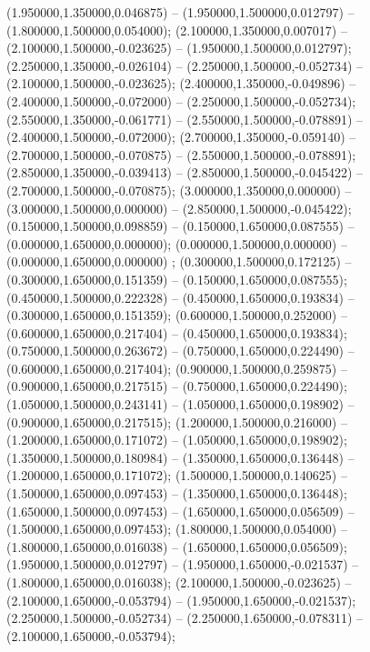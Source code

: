  (1.950000,1.350000,0.046875) -- (1.950000,1.500000,0.012797) -- (1.800000,1.500000,0.054000);
 (2.100000,1.350000,0.007017) -- (2.100000,1.500000,-0.023625) -- (1.950000,1.500000,0.012797);
 (2.250000,1.350000,-0.026104) -- (2.250000,1.500000,-0.052734) -- (2.100000,1.500000,-0.023625);
 (2.400000,1.350000,-0.049896) -- (2.400000,1.500000,-0.072000) -- (2.250000,1.500000,-0.052734);
 (2.550000,1.350000,-0.061771) -- (2.550000,1.500000,-0.078891) -- (2.400000,1.500000,-0.072000);
 (2.700000,1.350000,-0.059140) -- (2.700000,1.500000,-0.070875) -- (2.550000,1.500000,-0.078891);
 (2.850000,1.350000,-0.039413) -- (2.850000,1.500000,-0.045422) -- (2.700000,1.500000,-0.070875);
 (3.000000,1.350000,0.000000) -- (3.000000,1.500000,0.000000) -- (2.850000,1.500000,-0.045422);
 (0.150000,1.500000,0.098859) -- (0.150000,1.650000,0.087555) -- (0.000000,1.650000,0.000000);
 (0.000000,1.500000,0.000000) -- (0.000000,1.650000,0.000000) ;
 (0.300000,1.500000,0.172125) -- (0.300000,1.650000,0.151359) -- (0.150000,1.650000,0.087555);
 (0.450000,1.500000,0.222328) -- (0.450000,1.650000,0.193834) -- (0.300000,1.650000,0.151359);
 (0.600000,1.500000,0.252000) -- (0.600000,1.650000,0.217404) -- (0.450000,1.650000,0.193834);
 (0.750000,1.500000,0.263672) -- (0.750000,1.650000,0.224490) -- (0.600000,1.650000,0.217404);
 (0.900000,1.500000,0.259875) -- (0.900000,1.650000,0.217515) -- (0.750000,1.650000,0.224490);
 (1.050000,1.500000,0.243141) -- (1.050000,1.650000,0.198902) -- (0.900000,1.650000,0.217515);
 (1.200000,1.500000,0.216000) -- (1.200000,1.650000,0.171072) -- (1.050000,1.650000,0.198902);
 (1.350000,1.500000,0.180984) -- (1.350000,1.650000,0.136448) -- (1.200000,1.650000,0.171072);
 (1.500000,1.500000,0.140625) -- (1.500000,1.650000,0.097453) -- (1.350000,1.650000,0.136448);
 (1.650000,1.500000,0.097453) -- (1.650000,1.650000,0.056509) -- (1.500000,1.650000,0.097453);
 (1.800000,1.500000,0.054000) -- (1.800000,1.650000,0.016038) -- (1.650000,1.650000,0.056509);
 (1.950000,1.500000,0.012797) -- (1.950000,1.650000,-0.021537) -- (1.800000,1.650000,0.016038);
 (2.100000,1.500000,-0.023625) -- (2.100000,1.650000,-0.053794) -- (1.950000,1.650000,-0.021537);
 (2.250000,1.500000,-0.052734) -- (2.250000,1.650000,-0.078311) -- (2.100000,1.650000,-0.053794);
